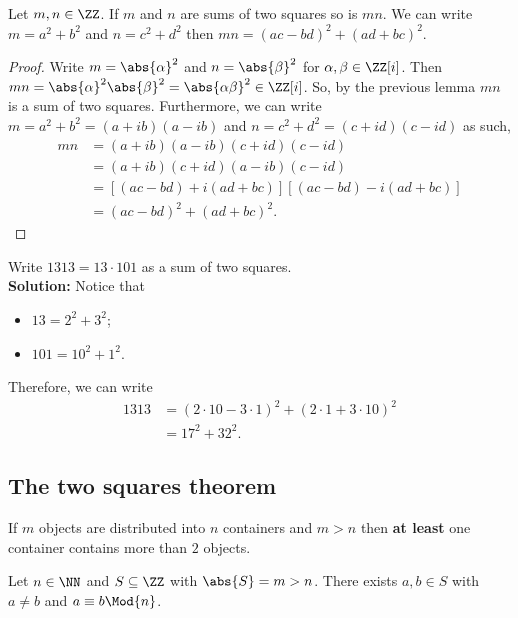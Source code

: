 \documentclass[12pt, a4paper]{article}
\begin{document}
\begin{mdthm}
    Let \(m,n \in \ZZ\). If \(m\) and \(n\) are sums of two squares so is \(mn\). We can write \(m = a^2 +b^2\) and \(n = c^2+d^2\) then \(mn=(ac-bd)^2+(ad+bc)^2\).
\end{mdthm}

\begin{proof}
    Write \(m=\abs{\alpha}^2\) and \(n=\abs{\beta}^2\) for \(\alpha, \beta \in \ZZ[i]\). Then \(mn =\abs{\alpha}^2 \abs{\beta}^2=\abs{\alpha \beta}^2 \in \ZZ[i]\). So, by the previous lemma \(mn\) is a sum of two squares. Furthermore, we can write \(m=a^2+b^2=(a+ib)(a-ib)\) and \(n=c^2+d^2=(c+id)(c-id)\) as such, 
    \[\begin{aligned}
        mn &= (a+ib)(a-ib)(c+id)(c-id) \\
            &= (a+ib)(c+id) (a-ib)(c-id) \\
            &= [(ac-bd) +i(ad+bc)][(ac-bd)-i(ad+bc)] \\
            &= (ac-bd)^2+(ad+bc)^2.
    \end{aligned}\]
\end{proof}

\begin{mdexample}
    Write \(1313 = 13 \cdot 101\) as a sum of two squares. \\
    \textbf{Solution:} Notice that
    \begin{itemize}
        \item \(13 =2^2+3^2\);
        \item \(101 = 10^2+1^2\).
    \end{itemize}
    Therefore, we can write
    \[\begin{aligned}
        1313 &= (2\cdot 10 -3\cdot 1)^2+(2\cdot 1 + 3 \cdot 10)^2 \\
        &= 17^2+32^2.
    \end{aligned}\]
\end{mdexample}

\subsection{The two squares theorem}

\begin{theorem}
    If \(m\) objects are distributed into \(n\) containers and \(m>n\) then \textbf{at least} one container contains more than \(2\) objects.
\end{theorem}

\begin{example}
    Let \(n \in \NN\) and \(S \subseteq \ZZ\) with \(\abs{S}=m>n\). There exists \(a,b \in S\) with \(a \neq b\) and \(a \equiv b \Mod{n}\).
\end{example}
\end{document}
